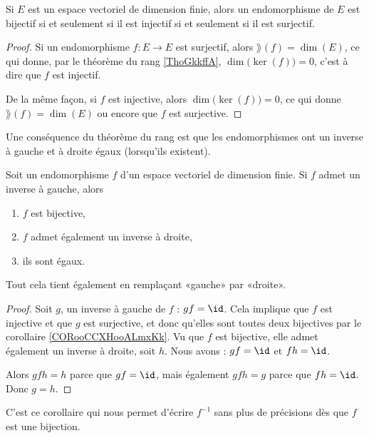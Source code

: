 \begin{corollary}       \label{CORooCCXHooALmxKk}
    Si \( E\) est un espace vectoriel de dimension finie, alors un endomorphisme de \( E\) est bijectif si et seulement si il est injectif si et seulement si il est surjectif.
\end{corollary}

\begin{proof}
    Si un endomorphisme \( f\colon E\to E\) est surjectif, alors \( \rang(f)=\dim(E)\), ce qui donne, par le théorème du rang \ref{ThoGkkffA}, \( \dim\big( \ker(f) \big)=0\), c'est à dire que \( f\) est injectif.

    De la même façon, si \( f\) est injective, alors \( \dim\big( \ker(f) \big)=0\), ce qui donne \( \rang(f)=\dim(E)\) ou encore que \( f\) est surjective.
\end{proof}

Une conséquence du théorème du rang est que les endomorphismes ont un inverse à gauche et à droite égaux (lorsqu'ils existent).
\begin{corollary}
    Soit un endomorphisme \( f\) d'un espace vectoriel de dimension finie. Si \( f\) admet un inverse à gauche, alors
    \begin{enumerate}
        \item
            \( f\) est bijective,
        \item
            \( f\) admet également un inverse à droite,
        \item
            ils sont égaux.
    \end{enumerate}
    Tout cela tient également en remplaçant «gauche» par «droite».
\end{corollary}

\begin{proof}
    Soit \( g\), un inverse à gauche de \( f\) : \( gf=\id\). Cela implique que \( f\) est injective et que \( g\) est surjective, et donc qu'elles sont toutes deux bijectives par le corollaire \ref{CORooCCXHooALmxKk}. Vu que \( f\) est bijective, elle admet également un inverse à droite, soit \( h\). Nous avons : \( gf=\id\) et \( fh=\id\).

    Alors \( gfh=h\) parce que \( gf=\id\), mais également \( gfh=g\) parce que \( fh=\id\). Donc \( g=h\).
\end{proof}
C'est ce corollaire qui nous permet d'écrire \( f^{-1}\) sans plus de précisions dès que \( f\) est une bijection.

